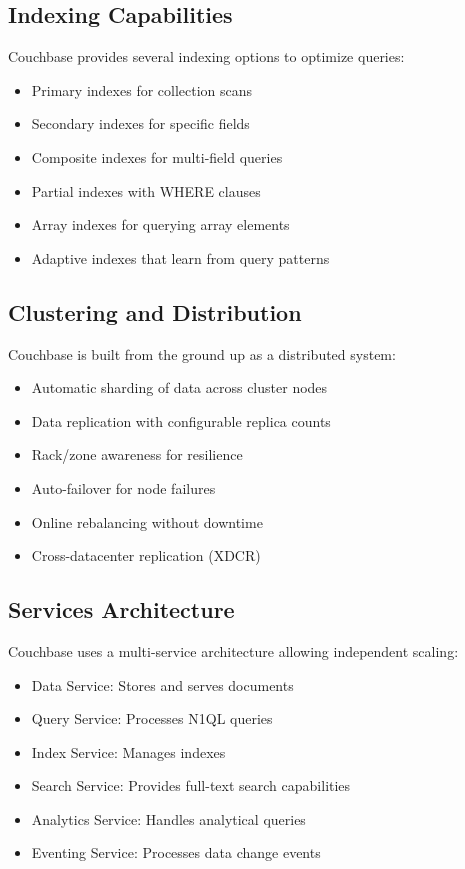 \subsection{Indexing Capabilities}
Couchbase provides several indexing options to optimize queries:
\begin{itemize}
  \item Primary indexes for collection scans
  \item Secondary indexes for specific fields
  \item Composite indexes for multi-field queries
  \item Partial indexes with WHERE clauses
  \item Array indexes for querying array elements
  \item Adaptive indexes that learn from query patterns
\end{itemize}

\subsection{Clustering and Distribution}
Couchbase is built from the ground up as a distributed system:
\begin{itemize}
  \item Automatic sharding of data across cluster nodes
  \item Data replication with configurable replica counts
  \item Rack/zone awareness for resilience
  \item Auto-failover for node failures
  \item Online rebalancing without downtime
  \item Cross-datacenter replication (XDCR)
\end{itemize}

\subsection{Services Architecture}
Couchbase uses a multi-service architecture allowing independent scaling:
\begin{itemize}
  \item Data Service: Stores and serves documents
  \item Query Service: Processes N1QL queries
  \item Index Service: Manages indexes
  \item Search Service: Provides full-text search capabilities
  \item Analytics Service: Handles analytical queries
  \item Eventing Service: Processes data change events
\end{itemize}

